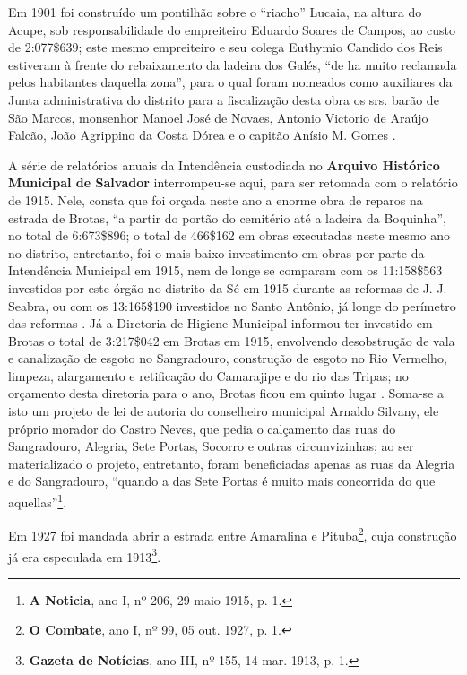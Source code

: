 Em 1901 foi construído um pontilhão sobre o ``riacho'' Lucaia, na altura do Acupe, sob responsabilidade do empreiteiro Eduardo Soares de Campos, ao custo de 2:077\$639; este mesmo empreiteiro e seu colega Euthymio Candido dos Reis estiveram à frente do rebaixamento da ladeira dos Galés, ``de ha muito reclamada pelos habitantes daquella zona'', para o qual foram nomeados como auxiliares da Junta administrativa do distrito para a fiscalização desta obra os srs. barão de São Marcos, monsenhor Manoel José de Novaes, Antonio Victorio de Araújo Falcão, João Agrippino da Costa Dórea e o capitão Anísio M. Gomes \cite[pp.~15, 162, 249-250]{salvador_relatorio_1901}.

A série de relatórios anuais da Intendência custodiada no \textbf{Arquivo Histórico Municipal de Salvador} interrompeu-se aqui, para ser retomada com o relatório de 1915. Nele, consta que foi orçada neste ano a enorme obra de reparos na estrada de Brotas, ``a partir do portão do cemitério até a ladeira da Boquinha'', no total de 6:673\$896; o total de 466\$162 em obras executadas neste mesmo ano no distrito, entretanto, foi o mais baixo investimento em obras por parte da Intendência Municipal em 1915, nem de longe se comparam com os 11:158\$563 investidos por este órgão no distrito da Sé em 1915 durante as reformas de J. J. Seabra, ou com os 13:165\$190 investidos no Santo Antônio, já longe do perímetro das reformas \cite[pp.~127-128]{salvador_relatorio_1916}. Já a Diretoria de Higiene Municipal informou ter investido em Brotas o total de 3:217\$042 em Brotas em 1915, envolvendo desobstrução de vala e canalização de esgoto no Sangradouro, construção de esgoto no Rio Vermelho, limpeza, alargamento e retificação do Camarajipe e do rio das Tripas; no orçamento desta diretoria para o ano, Brotas ficou em quinto lugar \cite[pp.~195-196]{salvador_relatorio_1916}. Soma-se a isto um projeto de lei de autoria do conselheiro municipal Arnaldo Silvany, ele próprio morador do Castro Neves, que pedia o calçamento das ruas do Sangradouro, Alegria, Sete Portas, Socorro e outras circunvizinhas; ao ser materializado o projeto, entretanto, foram beneficiadas apenas as ruas da Alegria e do Sangradouro, ``quando a das Sete Portas é muito mais concorrida do que aquellas''\footnote{\textbf{A Noticia}, ano I, nº 206, 29 maio 1915, p. 1.}.

Em 1927 foi mandada abrir a estrada entre Amaralina e Pituba\footnote{\textbf{O Combate}, ano I, nº 99, 05 out. 1927, p. 1.}, cuja construção já era especulada em 1913\footnote{\textbf{Gazeta de Notícias}, ano III, nº 155, 14 mar. 1913, p. 1.}.


